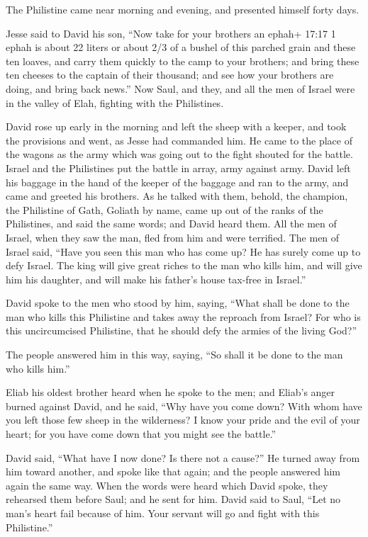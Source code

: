  The Philistine came near morning and evening, and
presented himself forty days.

 Jesse said to David his son, ``Now take for your brothers
an ephah+ 17:17 1 ephah is about 22 liters or about 2/3 of a bushel of
this parched grain and these ten loaves, and carry them quickly to the
camp to your brothers;  and bring these ten cheeses to the
captain of their thousand; and see how your brothers are doing, and
bring back news.''  Now Saul, and they, and all the men of
Israel were in the valley of Elah, fighting with the Philistines.

 David rose up early in the morning and left the sheep with
a keeper, and took the provisions and went, as Jesse had commanded him.
He came to the place of the wagons as the army which was going out to
the fight shouted for the battle.  Israel and the
Philistines put the battle in array, army against army. 
David left his baggage in the hand of the keeper of the baggage and ran
to the army, and came and greeted his brothers.  As he
talked with them, behold, the champion, the Philistine of Gath, Goliath
by name, came up out of the ranks of the Philistines, and said the same
words; and David heard them.  All the men of Israel, when
they saw the man, fled from him and were terrified.  The
men of Israel said, ``Have you seen this man who has come up? He has
surely come up to defy Israel. The king will give great riches to the
man who kills him, and will give him his daughter, and will make his
father's house tax-free in Israel.''

 David spoke to the men who stood by him, saying, ``What
shall be done to the man who kills this Philistine and takes away the
reproach from Israel? For who is this uncircumcised Philistine, that he
should defy the armies of the living God?''

 The people answered him in this way, saying, ``So shall it
be done to the man who kills him.''

 Eliab his oldest brother heard when he spoke to the men;
and Eliab's anger burned against David, and he said, ``Why have you come
down? With whom have you left those few sheep in the wilderness? I know
your pride and the evil of your heart; for you have come down that you
might see the battle.''

 David said, ``What have I now done? Is there not a
cause?''  He turned away from him toward another, and spoke
like that again; and the people answered him again the same way.
 When the words were heard which David spoke, they
rehearsed them before Saul; and he sent for him.  David
said to Saul, ``Let no man's heart fail because of him. Your servant
will go and fight with this Philistine.''

